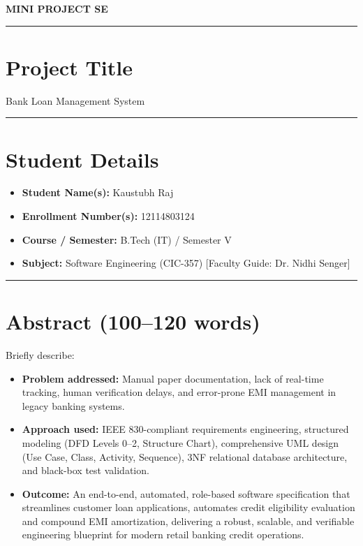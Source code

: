\documentclass[11pt,a4paper]{article}
\newcommand{\divider}{\vspace{1pt}\noindent\rule{\textwidth}{0.5pt}\vspace{3pt}}
\begin{document}

{\LARGE \textbf{MINI PROJECT SE}}\par
\vspace{2pt}
\noindent\rule{\textwidth}{1.2pt}
\vspace{2pt}

\section*{Project Title}
Bank Loan Management System

\divider

\section*{Student Details}
\begin{itemize}
    \item \textbf{Student Name(s):} Kaustubh Raj
    \item \textbf{Enrollment Number(s):} 12114803124
    \item \textbf{Course / Semester:} B.Tech (IT) / Semester V
    \item \textbf{Subject:} Software Engineering (CIC-357) [Faculty Guide: Dr. Nidhi Senger]
\end{itemize}

\divider

\section*{Abstract (100–120 words)}
Briefly describe:
\begin{itemize}
    \item \textbf{Problem addressed:} Manual paper documentation, lack of real-time tracking, human verification delays, and error-prone EMI management in legacy banking systems.
    \item \textbf{Approach used:} IEEE 830-compliant requirements engineering, structured modeling (DFD Levels 0--2, Structure Chart), comprehensive UML design (Use Case, Class, Activity, Sequence), 3NF relational database architecture, and black-box test validation.
    \item \textbf{Outcome:} An end-to-end, automated, role-based software specification that streamlines customer loan applications, automates credit eligibility evaluation and compound EMI amortization, delivering a robust, scalable, and verifiable engineering blueprint for modern retail banking credit operations.
\end{itemize}
\end{document}
